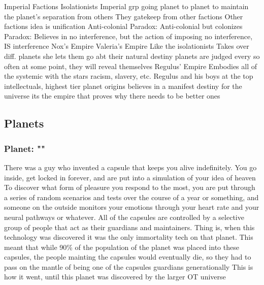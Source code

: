 \documentclass[12pt, titlepage]{article}
\begin{document}
\begin{outline}
    \1 Imperial Factions
        \2 Isolationists
            \3 Imperial grp going planet to planet to maintain the planet's separation from others
            \3 They gatekeep from other factions
            \3 Other factions idea is unification
            \3 Anti-colonial
            \3 Paradox: Anti-colonial but colonizes
            \3 Paradox: Believes in no interference, but  the action of imposing no interference, IS interference
        \2 Nox's Empire
            \3 
        \2 Valeria's Empire
            \3 Like the isolationists
            \3 Takes over diff. planets
            \3 she lets them go abt their natural destiny
            \3 planets are judged every so often
            \3 at some point, they will reveal themselves 
        \2 Regulus' Empire
            \3 Embodies all of the systemic with the stars
            \3 racism, slavery, etc. 
            \3 Regulus and his boys at the top
                \4 intellectuals, highest tier planet origins
            \3 believes in a manifest destiny for the universe
            \3 its the empire that proves why there needs to be better ones
\end{outline}

\subsection{Planets}

\subsubsection{Planet: ""}

There was a guy who invented a capsule that keeps you alive indefinitely. You go inside, get locked in forever, and are put into a simulation of your idea of heaven
To discover what form of pleasure you respond to the most, you are put through a series of random scenarios and tests over the course of a year or something, and someone on the outside monitors your emotions through your heart rate and your neural pathways or whatever.
All of the capsules are controlled by a selective group of people that act as their guardians and maintainers. Thing is, when this technology was discovered it was the only immortality tech on that planet. This meant that while 90\% of the population of the planet was placed into these capsules, the people mainting the capsules would eventually die, so they had to pass on the mantle of being one of the capsules guardians generationally
This is how it went, until this planet was discovered by the larger OT universe 
\end{document}
